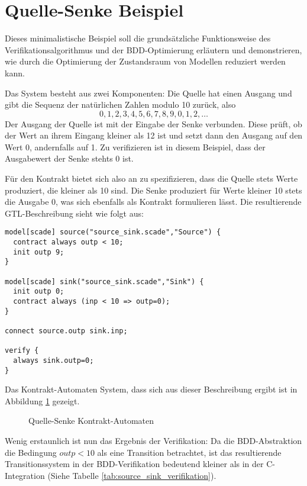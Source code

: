 \section{Quelle-Senke Beispiel}
Dieses minimalistische Beispiel soll die grundsätzliche Funktionsweise des Verifikationsalgorithmus und der BDD-Optimierung erläutern und demonstrieren, wie durch die Optimierung der Zustandsraum von Modellen reduziert werden kann.

Das System besteht aus zwei Komponenten:
Die Quelle hat einen Ausgang und gibt die Sequenz der natürlichen Zahlen modulo 10 zurück, also
\[ 0,1,2,3,4,5,6,7,8,9,0,1,2,\dots \]
Der Ausgang der Quelle ist mit der Eingabe der Senke verbunden.
Diese prüft, ob der Wert an ihrem Eingang kleiner als 12 ist und setzt dann den Ausgang auf den Wert 0, andernfalls auf 1.
Zu verifizieren ist in diesem Beispiel, dass der Ausgabewert der Senke stehts 0 ist.

Für den Kontrakt bietet sich also an zu spezifizieren, dass die Quelle stets Werte produziert, die kleiner als 10 sind.
Die Senke produziert für Werte kleiner 10 stets die Ausgabe 0, was sich ebenfalls als Kontrakt formulieren lässt.
Die resultierende GTL-Beschreibung sieht wie folgt aus:
\begin{lstlisting}[language=gtl,caption={Quelle-Senke Beispiel}]
model[scade] source("source_sink.scade","Source") {
  contract always outp < 10;
  init outp 9;
}

model[scade] sink("source_sink.scade","Sink") {
  init outp 0;
  contract always (inp < 10 => outp=0);
}

connect source.outp sink.inp;

verify {
  always sink.outp=0;
}
\end{lstlisting}
Das Kontrakt-Automaten System, dass sich aus dieser Beschreibung ergibt ist in Abbildung \ref{fig:source_sink_automata} gezeigt.

\begin{figure}[h]
  \centering
  \begin{tikzpicture}
    
  \end{tikzpicture}
  \caption{Quelle-Senke Kontrakt-Automaten}
  \label{fig:source_sink_automata}
\end{figure}

Wenig erstaunlich ist nun das Ergebnis der Verifikation:
Da die BDD-Abstraktion die Bedingung $\mathit{outp}<10$ als eine Transition betrachtet, ist das resultierende Transitionssystem in der BDD-Verifikation bedeutend kleiner als in der C-Integration (Siehe Tabelle \ref{tab:source_sink_verifikation}).

